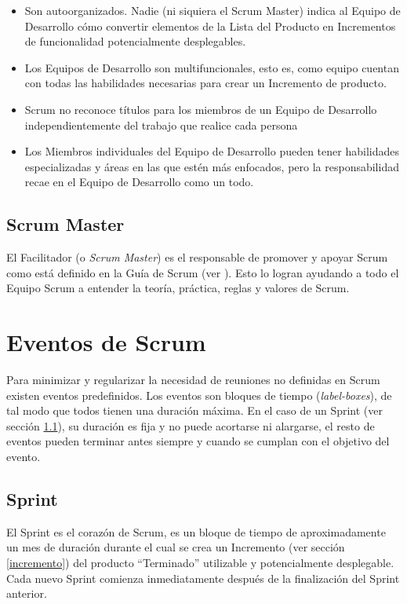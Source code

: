 \begin{itemize}
	\item Son autoorganizados. Nadie (ni siquiera el Scrum Master) indica al Equipo de Desarrollo cómo convertir elementos de la Lista del Producto en Incrementos de funcionalidad potencialmente desplegables.
	\item Los Equipos de Desarrollo son multifuncionales, esto es, como equipo cuentan con todas las habilidades necesarias para crear un Incremento de producto.
	\item Scrum no reconoce títulos para los miembros de un Equipo de Desarrollo independientemente del trabajo que realice cada persona
	\item Los Miembros individuales del Equipo de Desarrollo pueden tener habilidades especializadas y áreas en las que estén más enfocados, pero la responsabilidad recae en el Equipo de Desarrollo como un todo. 
\end{itemize}


\subsection{Scrum Master} \label{scrumMaster}

El Facilitador (o \emph{Scrum Master}) es el responsable de promover y apoyar Scrum como está definido en la Guía de Scrum (ver \cite{scrumSchwaber}). Esto lo logran ayudando a todo el Equipo Scrum a entender la teoría, práctica, reglas y valores de Scrum. \cite{scrumSchwaber}

\section{Eventos de Scrum}

Para minimizar y regularizar la necesidad de reuniones no definidas en Scrum existen eventos predefinidos. Los eventos son bloques de tiempo (\textit{label-boxes}), de tal modo que todos tienen una duración máxima. En el caso de un Sprint (ver sección \ref{sprint}), su duración es fija y no puede acortarse ni alargarse, el resto de eventos pueden terminar antes siempre y cuando se cumplan con el objetivo del evento. \cite{scrumSchwaber}


\subsection{Sprint} \label{sprint}
El Sprint es el corazón de Scrum, es un bloque de tiempo de aproximadamente un mes de duración durante el cual se crea un Incremento (ver sección \ref{incremento}) del producto “Terminado” utilizable y potencialmente desplegable. Cada nuevo Sprint comienza inmediatamente después de la finalización del Sprint anterior. \cite{scrumSchwaber}

